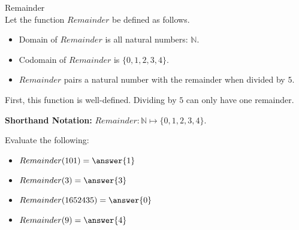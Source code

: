\documentclass{ximera}
\begin{document}
\begin{example} Remainder \\

Let the function $Remainder$ be defined as follows.


\begin{itemize}
\item Domain of $Remainder$ is all natural numbers: $\mathbb{N}$.
\item Codomain of $Remainder$ is $\{ 0, 1, 2, 3, 4 \}$.
\item $Remainder$ pairs a natural number with the remainder when divided by $5$.
\end{itemize}


First, this function is well-defined. Dividing by $5$ can only have one remainder.


\textbf{Shorthand Notation: } $Remainder: \mathbb{N} \mapsto \{ 0, 1, 2, 3, 4 \}$.

\begin{question}
Evaluate the following:

\begin{itemize}
	\item $Remainder(101) = \answer{1}$
	\item $Remainder(3) = \answer{3}$
	\item $Remainder(1652435) = \answer{0}$
	\item $Remainder(9) = \answer{4}$
\end{itemize}

\end{question}



\end{example}
\end{document}
